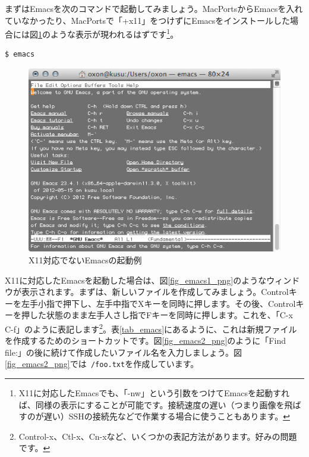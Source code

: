 まずはEmacsを次のコマンドで起動してみましょう。MacPortsからEmacsを入れていなかったり、MacPortsで「+x11」をつけずにEmacsをインストールした場合には図\ref{fig_emacs_nox11_png}のような表示が現われるはずです\footnote{X11に対応したEmacsでも、「-nw」という引数をつけてEmacsを起動すれば、同様の表示にすることが可能です。接続速度の遅い（つまり画像を飛ばすのが遅い）SSHの接続先などで作業する場合に使うこともあります。}。

\begin{lstlisting}[language=bash]
$ emacs
\end{lstlisting}

\begin{figure}
  \centering
  \includegraphics[scale=0.35]{fig/emacs_nox11.png}
  \caption{X11対応でないEmacsの起動例}
  \label{fig_emacs_nox11_png}
\end{figure}

X11に対応したEmacsを起動した場合は、図\ref{fig_emacs1_png}のようなウィンドウが表示されます。まずは、新しいファイルを作成してみましょう。Controlキーを左手小指で押下し、左手中指でXキーを同時に押します。その後、Controlキーを押した状態のまま左手人さし指でFキーを同時に押します。これを、「C-x C-f」のように表記します\footnote{Control-x、Ctl-x、Cn-xなど、いくつかの表記方法があります。好みの問題です。}。表\ref{tab_emacs}にあるように、これは新規ファイルを作成するためのショートカットです。図\ref{fig_emacs2_png}のように「Find file:」の後に続けて作成したいファイル名を入力しましょう。図\ref{fig_emacs2_png}では\texttt{~/foo.txt}を作成しています。

